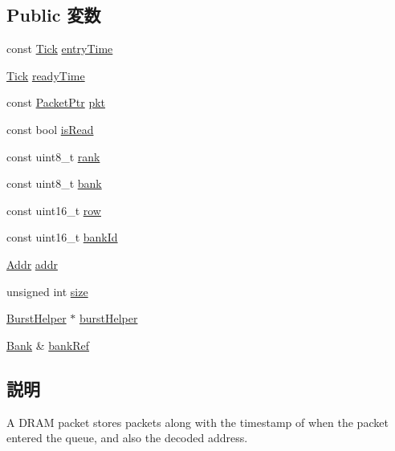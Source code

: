 \subsection*{Public 変数}
\begin{DoxyCompactItemize}
\item 
const \hyperlink{base_2types_8hh_a5c8ed81b7d238c9083e1037ba6d61643}{Tick} \hyperlink{classDRAMCtrl_1_1DRAMPacket_ab1ccb8a8c8d1a5b1c5f41693f4097e63}{entryTime}
\item 
\hyperlink{base_2types_8hh_a5c8ed81b7d238c9083e1037ba6d61643}{Tick} \hyperlink{classDRAMCtrl_1_1DRAMPacket_a7cb362ebfb8750bd53baf5e8f96e00d0}{readyTime}
\item 
const \hyperlink{classPacket}{PacketPtr} \hyperlink{classDRAMCtrl_1_1DRAMPacket_a6fb971eb547deb70a1eb9fc09047e9ae}{pkt}
\item 
const bool \hyperlink{classDRAMCtrl_1_1DRAMPacket_a932f133d9a9765cb284a8898c11a9c5f}{isRead}
\item 
const uint8\_\-t \hyperlink{classDRAMCtrl_1_1DRAMPacket_aa939c368630feb349e132c957bf16cc8}{rank}
\item 
const uint8\_\-t \hyperlink{classDRAMCtrl_1_1DRAMPacket_a8897945a64d084a58d8bbee43e74bbc6}{bank}
\item 
const uint16\_\-t \hyperlink{classDRAMCtrl_1_1DRAMPacket_a48cff24d2110d967f3f47db949e329e0}{row}
\item 
const uint16\_\-t \hyperlink{classDRAMCtrl_1_1DRAMPacket_a81996324dee2e231987a689d700a4dc2}{bankId}
\item 
\hyperlink{base_2types_8hh_af1bb03d6a4ee096394a6749f0a169232}{Addr} \hyperlink{classDRAMCtrl_1_1DRAMPacket_a0bb77b4ba61e408313e1118250f9278c}{addr}
\item 
unsigned int \hyperlink{classDRAMCtrl_1_1DRAMPacket_aac913b3a1f6ef005d66bf7a84428773e}{size}
\item 
\hyperlink{classDRAMCtrl_1_1BurstHelper}{BurstHelper} $\ast$ \hyperlink{classDRAMCtrl_1_1DRAMPacket_ad3b6db2cc317849c6f88f306116e6540}{burstHelper}
\item 
\hyperlink{classDRAMCtrl_1_1Bank}{Bank} \& \hyperlink{classDRAMCtrl_1_1DRAMPacket_ad74d737401d318ad6e3449a0826de315}{bankRef}
\end{DoxyCompactItemize}


\subsection{説明}
A DRAM packet stores packets along with the timestamp of when the packet entered the queue, and also the decoded address. 

